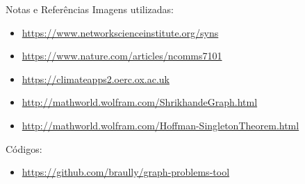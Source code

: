 \begin{frame}{Notas e Referências}
Imagens utilizadas:
\begin{itemize}
    \item{\url{https://www.networkscienceinstitute.org/syns}}
    \item{\url{https://www.nature.com/articles/ncomms7101}}
    \item{\url{https://climateapps2.oerc.ox.ac.uk}}
    \item{\url{http://mathworld.wolfram.com/ShrikhandeGraph.html}}
    \item{\url{http://mathworld.wolfram.com/Hoffman-SingletonTheorem.html}}
\end{itemize}
Códigos:
\begin{itemize}
\item{\url{https://github.com/braully/graph-problems-tool}}
\end{itemize}
\end{frame}